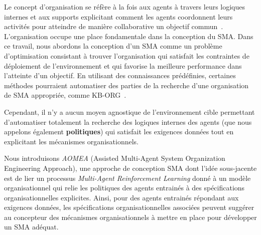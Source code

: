 Le concept d'organisation se réfère à la fois aux agents à travers leurs logiques internes et aux supports explicitant comment les agents coordonnent leurs activités pour atteindre de manière collaborative un objectif commun~\cite{Picard2009}. L'organisation occupe une place fondamentale dans la conception du SMA.
%
%
%
%
%
Dans ce travail, nous abordons la conception d'un SMA comme un problème d'optimisation consistant à trouver l'organisation qui satisfait les contraintes de déploiement de l'environnement et qui favorise la meilleure performance dans l'atteinte d'un objectif.
En utilisant des connaissances prédéfinies, certaines méthodes pourraient automatiser des parties de la recherche d'une organisation de SMA appropriée, comme KB-ORG~\cite{Sims2008}.

Cependant, il n'y a aucun moyen agnostique de l'environnement cible permettant d'automatiser totalement la recherche des logiques internes des agents (que nous appelons également \textbf{politiques}) qui satisfait les exigences données tout en explicitant les mécanismes organisationnels. %

Nous introduisons \emph{AOMEA} (Assisted Multi-Agent System Organization Engineering Approach), une approche de conception SMA dont l'idée sous-jacente est de lier un processus \emph{Multi-Agent Reinforcement Learning} donné à un modèle organisationnel qui relie les politiques des agents entrainés à des spécifications organisationnelles explicites. Ainsi, pour des agents entrainés répondant aux exigences données, les spécifications organisationnelles associées peuvent suggérer au concepteur des mécanismes organisationnels à mettre en place pour développer un SMA adéquat.%

